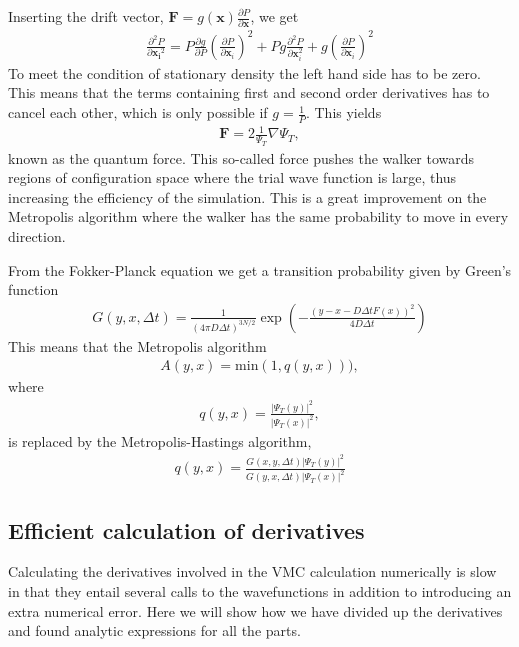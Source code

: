 \documentclass[11pt]{article}
\begin{document}
		Inserting the drift vector, $\mathbf{F}=g(\mathbf{x})\frac{\partial P}{\partial\mathbf{x}}$,
		we get
		\begin{align}
			\frac{\partial^{2}P}{\partial{\mathbf{x_{i}}^{2}}}=P\frac{\partial g}{\partial P}\left(\frac{\partial P}{\partial{\mathbf{x}_{i}}}\right)^{2}+Pg\frac{\partial^{2}P}{\partial{\mathbf{x}_{i}^{2}}}+g\left(\frac{\partial P}{\partial{\mathbf{x}_{i}}}\right)^{2}
		\end{align}
		To meet the condition of stationary density the left hand side has
		to be zero. This means that the terms containing first and second
		order derivatives has to cancel each other, which is only possible
		if $g=\frac{1}{P}$. This yields
		\begin{align}
			\mathbf{F}=2\frac{1}{\Psi_{T}}\nabla\Psi_{T},
		\end{align}
		known as the quantum force. This so-called force pushes the walker
		towards regions of configuration space where the trial wave function
		is large, thus increasing the efficiency of the simulation. This is
		a great improvement on the Metropolis algorithm where the walker has
		the same probability to move in every direction.

		From the Fokker-Planck equation we get a transition probability given
		by Green's function
		\begin{align}
			G(y,x,\Delta t)=\frac{1}{(4\pi D\Delta t)^{3N/2}}\exp\left(-\frac{(y-x-D\Delta tF(x))^{2}}{4D\Delta t}\right)
		\end{align}
		This means that the Metropolis algorithm
		\begin{align}
			A(y,x)=\mathrm{min}(1,q(y,x))),
		\end{align}
		where
		\begin{align}
			q(y,x)=\frac{|\Psi_{T}(y)|^{2}}{|\Psi_{T}(x)|^{2}},
		\end{align}
		is replaced by the Metropolis-Hastings algorithm,
		\begin{align}
			q(y,x)=\frac{G(x,y,\Delta t)|\Psi_{T}(y)|^{2}}{G(y,x,\Delta t)|\Psi_{T}(x)|^{2}}
		\end{align}

		\subsection{Efficient calculation of derivatives}
		Calculating the derivatives involved in the VMC calculation numerically is slow in that they entail several calls to the wavefunctions in addition to introducing an extra numerical error. Here we will show how we have divided up the derivatives and found analytic expressions for all the parts.
\end{document}

